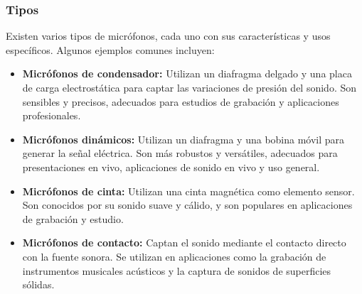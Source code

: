\documentclass[
	12pt, %
	fleqn, %
	a4paper, %
	oneside, %
]{LegrandOrangeBook}
\begin{document}
\subsubsection*{Tipos}
Existen varios tipos de micrófonos, cada uno con sus características y usos específicos. Algunos ejemplos comunes incluyen:
\begin{itemize}
\item \textbf{Micrófonos de condensador:} Utilizan un diafragma delgado y una placa de carga electrostática para captar las variaciones de presión del sonido. Son sensibles y precisos, adecuados para estudios de grabación y aplicaciones profesionales.
\item \textbf{Micrófonos dinámicos:} Utilizan un diafragma y una bobina móvil para generar la señal eléctrica. Son más robustos y versátiles, adecuados para presentaciones en vivo, aplicaciones de sonido en vivo y uso general.
\item \textbf{Micrófonos de cinta:} Utilizan una cinta magnética como elemento sensor. Son conocidos por su sonido suave y cálido, y son populares en aplicaciones de grabación y estudio.
\item \textbf{Micrófonos de contacto:} Captan el sonido mediante el contacto directo con la fuente sonora. Se utilizan en aplicaciones como la grabación de instrumentos musicales acústicos y la captura de sonidos de superficies sólidas.
\end{itemize}
\end{document}
